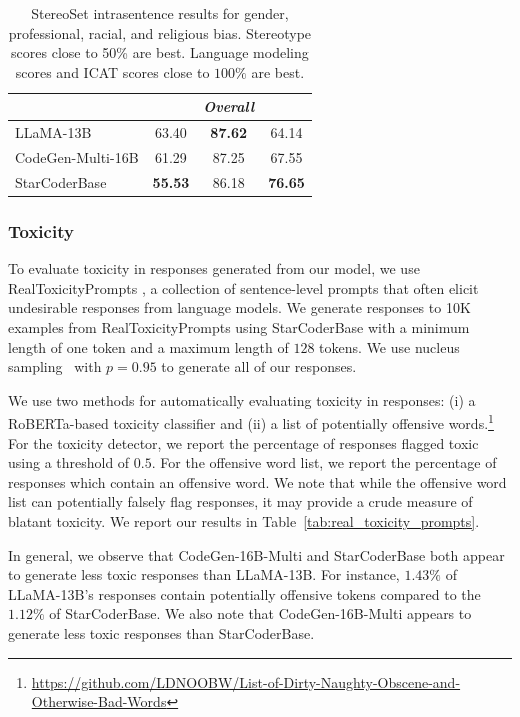 \documentclass[10pt]{article} %
\begin{document}
\begin{table}[t]
\begin{tabular}{lccc}
        \midrule
        & & \emph{Overall} \\
        \midrule
        LLaMA-13B & 63.40 & \textbf{87.62} & 64.14 \\
        CodeGen-Multi-16B & 61.29 & 87.25 & 67.55 \\
        StarCoderBase & \textbf{55.53} & 86.18 & \textbf{76.65} \\
        \bottomrule
    \end{tabular}
    \caption{StereoSet intrasentence results for gender, professional, racial, and religious bias. Stereotype scores close to 50\% are best. Language modeling scores and ICAT scores close to $100\%$ are best.}
    \label{tab:stereoset}
\end{table}

\subsubsection{Toxicity}\label{sec:toxicty}
To evaluate toxicity in responses generated from our model, we use RealToxicityPrompts \citep{gehman_realtoxicityprompts_2020}, a collection of sentence-level prompts that often elicit undesirable responses from language models.
We generate responses to 10K examples from RealToxicityPrompts using StarCoderBase with a minimum length of one token and a maximum length of $128$ tokens.
We use nucleus sampling~\citep{holtzman2020curious} with $p = 0.95$ to generate all of our responses.

We use two methods for automatically evaluating toxicity in responses: (i) a RoBERTa-based \citep{liu2019roberta} toxicity classifier \citep{vidgen_learning_2021} and (ii) a list of potentially offensive words.\footnote{\url{https://github.com/LDNOOBW/List-of-Dirty-Naughty-Obscene-and-Otherwise-Bad-Words}}
For the toxicity detector, we report the percentage of responses flagged toxic using a threshold of $0.5$. 
For the offensive word list, we report the percentage of responses which contain an offensive word.
We note that while the offensive word list can potentially falsely flag responses, it may provide a crude measure of blatant toxicity.
We report our results in Table~\ref{tab:real_toxicity_prompts}. 

In general, we observe that CodeGen-16B-Multi and StarCoderBase both appear to generate less toxic responses than LLaMA-13B.
For instance, $1.43\%$ of LLaMA-13B's responses contain potentially offensive tokens compared to the $1.12\%$ of StarCoderBase.
We also note that CodeGen-16B-Multi appears to generate less toxic responses than StarCoderBase.
\end{document}

